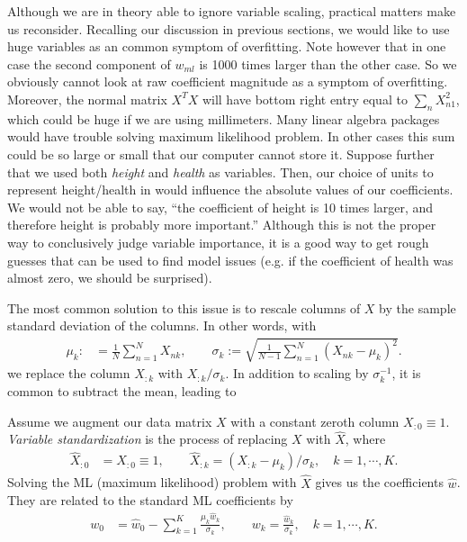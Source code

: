 Although we are in theory able to ignore variable scaling, practical matters make us reconsider.  Recalling our discussion in previous sections, we would like to use huge variables as an common symptom of overfitting. Note however that in one case the second component of $w_{ml}$ is 1000 times larger than the other case.  So we obviously cannot look at raw coefficient magnitude as a symptom of overfitting.  Moreover, the normal matrix $X^TX$ will have bottom right entry equal to $\sum_n X_{n1}^2$, which could be huge if we are using millimeters.  Many linear algebra packages would have trouble solving maximum likelihood problem.  In other cases this sum could be so large or small that our computer cannot store it.  Suppose further that we used both \emph{height} and \emph{health} as variables.  Then, our choice of units to represent height/health in would influence the absolute values of our coefficients.  We would not be able to say, ``the coefficient of height is 10 times larger, and therefore height is probably more important.''  Although this is not the proper way to conclusively judge variable importance, it is a good way to get rough guesses that can be used to find model issues (e.g. if the coefficient of health was almost zero, we should be surprised).

The most common solution to this issue is to rescale columns of $X$ by the sample standard deviation of the columns.  In other words, with 
\begin{align*}
  \mu_k :&= \frac{1}{N}\sum_{n=1}^N X_{nk},\qquad \sigma_k := \sqrt{\frac{1}{N-1}\sum_{n=1}^N \left( X_{nk} - \mu_k \right)^2}.
\end{align*}
we replace the column $X_{:k}$ with $X_{:k}/\sigma_k$.  In addition to scaling by $\sigma_k^{-1}$, it is common to subtract the mean, leading to
\begin{definition}
  \label{linear:definition:standardization}
  Assume we augment our data matrix $X$ with a constant zeroth column $X_{:0}\equiv1$.  \emph{Variable standardization} is the process of replacing $X$ with $\hat X$, where
  \begin{align*}
    \hat X_{:0} &= X_{:0} \equiv 1,\qquad \hat X_{:k} = (X_{:k} - \mu_k) / \sigma_k,\quad k=1,\cdots,K.
  \end{align*}
  Solving the ML (maximum likelihood) problem with $\hat X$ gives us the coefficients $\hat w$.  They are related to the standard ML coefficients by
  \begin{align*}
    w_0 &= \hat w_0 - \sum_{k=1}^K\frac{\mu_k\hat w_k}{\sigma_k},\qquad w_k = \frac{\hat w_k}{\sigma_k},\quad k = 1,\cdots,K.
  \end{align*}
\end{definition}

